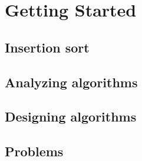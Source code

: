 \chapter{Getting Started}
  \section{Insertion sort}
    
    

  \section{Analyzing algorithms}
%    
%    

  \section{Designing algorithms}
%    
%    

  \section{Problems}
%    
%    
